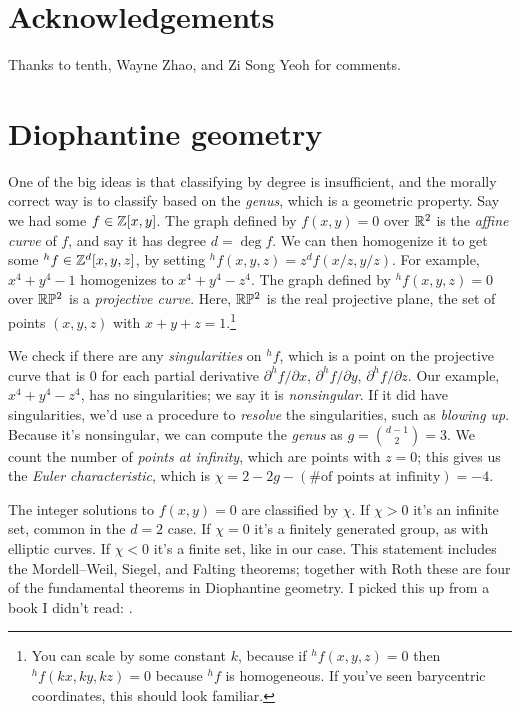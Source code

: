 \documentclass[11pt,paper=letter]{scrartcl}
\begin{document}
\pagebreak
{}
\printbibliography[prenote=prenote]

\section*{Acknowledgements}

Thanks to tenth, Wayne Zhao, and Zi Song Yeoh for comments.

\appendix

\section{Diophantine geometry}
\label{sec:dioph}

One of the big ideas is that classifying by degree is insufficient, and the morally correct way is to classify based on the \textit{genus}, which is a geometric property. Say we had some $f \in \mathbb Z[x, y]$. The graph defined by $f(x, y) = 0$ over $\mathbb R^2$ is the \textit{affine curve} of $f$, and say it has degree $d = \deg f$. We can then homogenize it to get some $^hf \in \mathbb Z^{d}[x, y, z]$, by setting $^hf(x, y, z) = z^{d}f(x/z, y/z)$. For example, $x^4 + y^4 - 1$ homogenizes to $x^4 + y^4 - z^4$. The graph defined by $^hf(x, y, z) = 0$ over $\mathbb R\mathbb P^2$ is a \textit{projective curve}. Here, $\mathbb R\mathbb P^2$ is the real projective plane, the set of points $(x, y, z)$ with $x + y + z = 1$.\footnote{You can scale by some constant $k$, because if $^hf(x, y, z) = 0$ then $^hf(kx, ky, kz) = 0$ because $^hf$ is homogeneous. If you've seen barycentric coordinates, this should look familiar.}

We check if there are any \textit{singularities} on $^hf$, which is a point on the projective curve that is $0$ for each partial derivative $\partial^hf/\partial x$, $\partial ^hf/\partial y$, $\partial ^hf/\partial z$. Our example, $x^4 + y^4 - z^4$, has no singularities; we say it is \textit{nonsingular}. If it did have singularities, we'd use a procedure to \textit{resolve} the singularities, such as \textit{blowing up}. Because it's nonsingular, we can compute the \textit{genus} as $g = \binom{d-1}{2} = 3$. We count the number of \textit{points at infinity}, which are points with $z = 0$; this gives us the \textit{Euler characteristic}, which is $\chi = 2 - 2g - (\text{\# of points at infinity}) = -4$.

The integer solutions to $f(x, y) = 0$ are classified by $\chi$. If $\chi > 0$ it's an infinite set, common in the $d = 2$ case. If $\chi = 0$ it's a finitely generated group, as with elliptic curves. If $\chi < 0$ it's a finite set, like in our case. This statement includes the Mordell--Weil, Siegel, and Falting theorems; together with Roth these are four of the fundamental theorems in Diophantine geometry. I picked this up from a book I didn't read: \cite{hindry13}.
\end{document}
